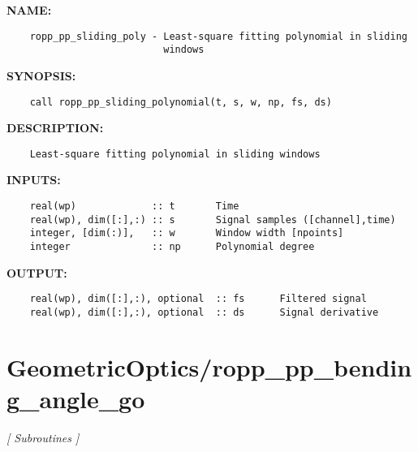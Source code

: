 \label{ch:robo17}
\label{ch:FFT_ropp_pp_sliding_polynomial}
\textbf{NAME:}\hspace{0.08in}\begin{Verbatim}
    ropp_pp_sliding_poly - Least-square fitting polynomial in sliding
                           windows
\end{Verbatim}
\textbf{SYNOPSIS:}\hspace{0.08in}\begin{Verbatim}
    call ropp_pp_sliding_polynomial(t, s, w, np, fs, ds)
\end{Verbatim}
\textbf{DESCRIPTION:}\hspace{0.08in}\begin{Verbatim}
    Least-square fitting polynomial in sliding windows 
\end{Verbatim}
\textbf{INPUTS:}\hspace{0.08in}\begin{Verbatim}
    real(wp)             :: t       Time
    real(wp), dim([:],:) :: s       Signal samples ([channel],time)
    integer, [dim(:)],   :: w       Window width [npoints]
    integer              :: np      Polynomial degree
\end{Verbatim}
\textbf{OUTPUT:}\hspace{0.08in}\begin{Verbatim}
    real(wp), dim([:],:), optional  :: fs      Filtered signal
    real(wp), dim([:],:), optional  :: ds      Signal derivative
\end{Verbatim}
\section{GeometricOptics/ropp\_pp\_bending\_angle\_go}
\textsl{[ Subroutines ]}


